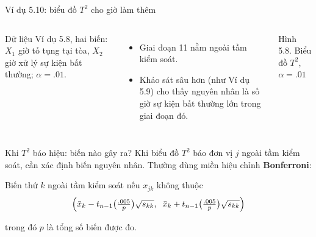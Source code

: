 \begin{frame}{Ví dụ 5.10: biểu đồ \(T^2\) cho giờ làm thêm}
  \begin{columns}[T]
    Dữ liệu Ví dụ 5.8, hai biến: \(X_1\) giờ tố tụng tại tòa, \(X_2\) giờ xử lý sự kiện bất thường; \(\alpha=.01\).
    \begin{itemize}
      \item Giai đoạn 11 nằm ngoài tầm kiểm soát.
      \item Khảo sát sâu hơn (như Ví dụ 5.9) cho thấy nguyên nhân là số giờ sự kiện bất thường lớn trong giai đoạn đó.
    \end{itemize}
    \centering
    \resizebox{\linewidth}{!}{}

    {\scriptsize Hình 5.8. Biểu đồ \(T^2\), \(\alpha=.01\)}
  \end{columns}
\end{frame}

\begin{frame}{Khi \(T^2\) báo hiệu: biến nào gây ra?}
  Khi biểu đồ \(T^2\) báo đơn vị \(j\) ngoài tầm kiểm soát, cần xác định biến nguyên nhân. Thường dùng miền hiệu chỉnh \textbf{Bonferroni}:
  \begin{block}{Biến thứ \(k\) ngoài tầm kiểm soát nếu \(x_{jk}\) không thuộc}
    \begin{equation*}
      \Bigl(\bar{x}_k-t_{n-1}\bigl(\tfrac{.005}{p}\bigr)\sqrt{s_{kk}},\;\;
      \bar{x}_k+t_{n-1}\bigl(\tfrac{.005}{p}\bigr)\sqrt{s_{kk}}\Bigr)
    \end{equation*}
  \end{block}
  trong đó \(p\) là tổng số biến được đo.
\end{frame}

